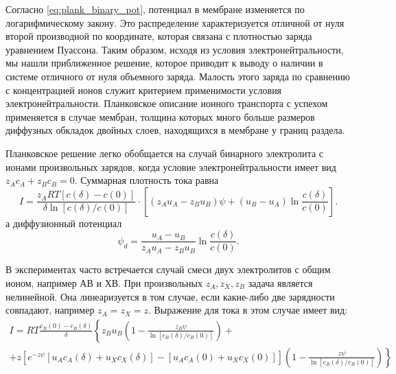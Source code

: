 Согласно \eqref{eq:plank_binary_pot}, потенциал в мембране изменяется по
логарифмическому закону. Это распределение характеризуется отличной от нуля
второй производной по координате, которая связана с плотностью заряда уравнением
Пуассона. Таким образом, исходя из условия электронейтральности, мы нашли
приближенное решение, которое приводит к выводу о наличии в системе отличного от
нуля объемного заряда. Малость этого заряда по сравнению с концентрацией ионов
служит критерием применимости условия электронейтральности. Планковское описание
ионного транспорта с успехом применяется в случае мембран, толщина которых много
больше размеров диффузных обкладок двойных слоев, находящихся в мембране у
границ раздела.

Планковское решение легко обобщается на случай бинарного электролита с ионами
произвольных зарядов, когда условие электронейтральности имеет вид
\( z_Ac_A + z_Bc_B = 0\). Суммарная плотность тока равна
\begin{equation}
    I = \frac{z_ART[c(\delta) - c(0)]}{\delta\ln[c(\delta)/c(0)]}\cdot
    \left[(z_Au_A - z_Bu_B)\psi + (u_B - u_A)\ln\frac{c(\delta)}{c(0)}\right].
\end{equation}
а диффузионный потенциал
\begin{equation}
    \psi_d = \frac{u_A - u_B}{z_Au_A - z_Bu_B}\ln\frac{c(\delta)}{c(0)}.
\end{equation}

В экспериментах часто встречается случай смеси двух электролитов с общим ионом,
например АВ и ХВ. При произвольных \( z_A, z_X, z_B \) задача является
нелинейной. Она линеаризуется в том случае, если какие-либо две зарядности
совпадают, например \( z_A = z_X = z \). Выражение для тока в этом случае имеет
вид:
\begin{gather}
    I = RT\frac{c_B(0) - c_B(\delta)}{\delta}\left\{
        z_Bu_B\left(1-\frac{z_B\psi}{\ln[c_B(\delta)/c_B(0)]}\right)
        + \right.\\ +\left.
        z\left[e^{-z\psi}[u_Ac_A(\delta) + u_Xc_X(\delta)] -
        [u_Ac_A(0) + u_Xc_X(0)]\right]
        \left(1-\frac{z\psi}{\ln[c_B(\delta)/c_B(0)]}\right)\right\}
        \label{eq:plank_ternary_current}
\end{gather}

